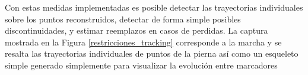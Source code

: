 Con estas medidas implementadas es posible detectar las trayectorias individuales sobre los puntos reconstruidos, detectar de forma simple posibles discontinuidades, y estimar reemplazos en casos de perdidas. La captura mostrada en la Figura \ref{restricciones_tracking} corresponde a la marcha y se resalta las trayectorias individuales de puntos de la pierna así como un esqueleto simple generado simplemente para visualizar la evolución entre marcadores

\begin{figure}[ht!]
 \hspace{-1.3cm}

\end{figure}
